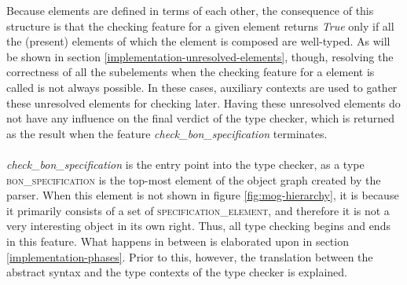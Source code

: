 Because \bon{} elements are defined in terms of each other, the consequence of this structure is that the checking feature for a given \bon{} element returns \textit{True} only if all the (present) elements of which the element is composed are well-typed. As will be shown in section \ref{implementation-unresolved-elements}, though, resolving the correctness of all the subelements when the checking feature for a \bon{} element is called is not always possible. In these cases, auxiliary contexts are used to gather these unresolved \bon{} elements for checking later. Having these unresolved elements do not have any influence on the final verdict of the type checker, which is returned as the result when the feature \textit{check\_bon\_specification} terminates.
\paragraph{}
\textit{check\_bon\_specification} is the entry point into the type checker, as a type \textsc{bon\_specification} is the top-most element of the object graph created by the parser. When this element is not shown in figure \ref{fig:mog-hierarchy}, it is because it primarily consists of a set of \textsc{specification\_element}, and therefore it is not a very interesting object in its own right. Thus, all type checking begins and ends in this feature. What happens in between is elaborated upon in section \ref{implementation-phases}. Prior to this, however, the translation between the abstract syntax and the type contexts of the type checker is explained.

